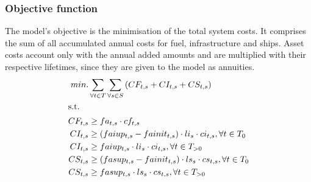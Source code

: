 \documentclass[article]{elsarticle}
\begin{document}
\subsubsection{Objective function}
\noindent The model's objective is the minimisation of the total system costs. It comprises the sum of all accumulated annual costs for fuel, infrastructure and ships. Asset costs account only with the annual added amounts and are multiplied with their respective lifetimes, since they are given to the model as annuities.
\begin{subequations}
    \begin{align}
        min. &\sum_{\forall t \in T}\sum_{\forall s \in S}\left( CF_{t, s} + CI_{t, s} + CS_{t, s} \right)\label{eq:objective}\\
        \intertext{s.t.}
        CF_{t, s} &\geq fa_{t,s} \cdot cf_{t,s}\\
        CI_{t, s} &\geq \left( faiup_{t,s} - fainit_{t, s} \right) \cdot li_{s} \cdot ci_{t,s}, \forall t \in T_0\\
        CI_{t, s} &\geq faiup_{t,s} \cdot li_{s} \cdot ci_{t,s}, \forall t \in T_{>0}\\
        CS_{t, s} &\geq \left( fasup_{t,s} - fainit_{t, s} \right) \cdot ls_{s} \cdot cs_{t,s}, \forall t \in T_0\\
        CS_{t, s} &\geq fasup_{t,s} \cdot ls_{s} \cdot cs_{t,s}, \forall t \in T_{>0}
    \end{align}
\end{subequations}
\end{document}
